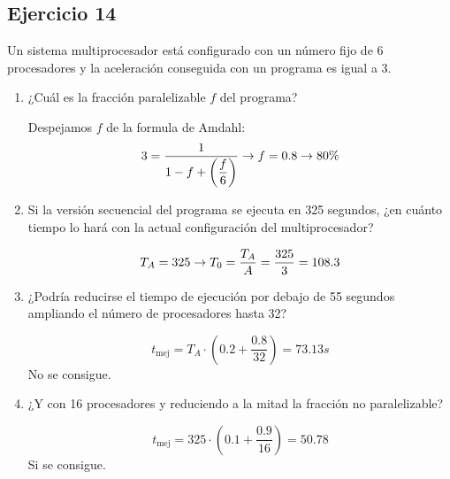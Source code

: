 \subsection{Ejercicio 14}
\noindent
Un sistema multiprocesador está configurado con un número fijo de 6 procesadores y la aceleración conseguida con un programa es igual a 3.
\begin{enumerate}
    \item ¿Cuál es la fracción paralelizable $f$ del programa?
\begin{tcolorbox}[colback=white,colframe=cyan!50!black,fonttitle=\bfseries]
Despejamos $f$ de la formula de Amdahl:
\[
3=\dfrac{1}{1-f+\left(\dfrac{f}{6}\right)}\rightarrow f=0.8\rightarrow 80\%
\]
\end{tcolorbox}    
    \item Si la versión secuencial del programa se ejecuta en 325 segundos, ¿en cuánto tiempo lo hará con la actual configuración del multiprocesador?
\begin{tcolorbox}[colback=white,colframe=cyan!50!black,fonttitle=\bfseries]
\[
T_A=325\rightarrow T_0=\dfrac{T_A}{A}=\dfrac{325}{3}=108.3
\]
\end{tcolorbox}    
    \item ¿Podría reducirse el tiempo de ejecución por debajo de 55 segundos ampliando el número de procesadores hasta 32?
\begin{tcolorbox}[colback=white,colframe=cyan!50!black,fonttitle=\bfseries]
\[
t_{\text{mej}}=T_A\cdot\left(0.2+\dfrac{0.8}{32}\right)=73.13s
\]
No se consigue.
\end{tcolorbox}    
    \item ¿Y con 16 procesadores y reduciendo a la mitad la fracción no paralelizable?
\begin{tcolorbox}[colback=white,colframe=cyan!50!black,fonttitle=\bfseries]
\[
t_{\text{mej}}=325\cdot\left(0.1+\dfrac{0.9}{16}\right)=50.78
\]
Si se consigue.
\end{tcolorbox}    
\end{enumerate}



